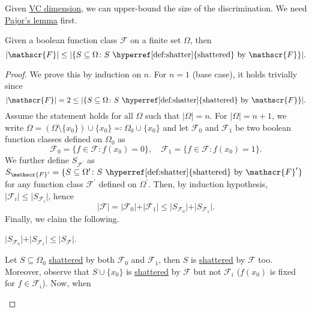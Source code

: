 Given \hyperref[def:VC-dimension]{VC dimension}, we can upper-bound the size of the discrimination. We need \hyperref[lma:Pajor]{Pajor's lemma} first.

\begin{lemma}\label{lma:Pajor}
	Given a boolean function class \(\mathscr{F} \) on a finite set \(\Omega \), then
	\[
		\vert \mathscr{F} \vert \leq \vert \{ S \subseteq \Omega \colon S \text{ \hyperref[def:shatter]{shattered} by } \mathscr{F} \} \vert.
	\]
\end{lemma}
\begin{proof}
	We prove this by induction on \(n\). For \(n = 1\) (base case), it holds trivially since
	\[
		\vert \mathscr{F} \vert = 2 \leq \vert \{ S \subseteq \Omega \colon S \text{ \hyperref[def:shatter]{shattered} by } \mathscr{F} \} \vert.
	\]
	Assume the statement holds for all \(\Omega \) such that \(\vert \Omega \vert = n\). For \(\vert \Omega \vert = n+1\), we write \(\Omega = (\Omega \setminus \{ x_0 \} ) \cup \{ x_0 \} \eqqcolon \Omega _0 \cup \{ x_0 \}\) and let \(\mathscr{F} _0\) and \(\mathscr{F} _1\) be two boolean function classes defined on \(\Omega _0\) as
	\[
		\mathscr{F} _0 = \{ f\in \mathscr{F} \colon f(x_0) = 0\} ,\quad
		\mathscr{F} _1 = \{ f\in \mathscr{F} \colon f(x_0) = 1\} .
	\]
	We further define \(S_{\mathscr{F} ^{\prime} }\) as \(S_{\mathscr{F} ^{\prime} } = \{ S \subseteq \Omega ^{\prime} \colon S \text{ \hyperref[def:shatter]{shattered} by } \mathscr{F} ^{\prime} \}\) for any function class \(\mathscr{F} ^{\prime} \) defined on \(\Omega ^{\prime} \). Then, by induction hypothesis, \(\vert \mathscr{F} _i \vert \leq \vert S_{\mathscr{F} _i} \vert \), hence
	\[
		\vert \mathscr{F} \vert = \vert \mathscr{F} _0 \vert + \vert \mathscr{F} _1 \vert \leq \vert S_{\mathscr{F} _0} \vert + \vert S_{\mathscr{F} _1} \vert.
	\]
	Finally, we claim the following.
	\begin{claim}
		\(\vert S_{\mathscr{F} _0} \vert + \vert S_{\mathscr{F} _1} \vert \leq \vert S _{\mathscr{F} } \vert\).
	\end{claim}
	\begin{explanation}
		Let \(S \subseteq \Omega _0\) \hyperref[def:shatter]{shattered} by both \(\mathscr{F} _0\) and \(\mathscr{F} _1\), then \(S\) is \hyperref[def:shatter]{shattered} by \(\mathscr{F} \) too. Moreover, observe that \(S \cup \{ x_0 \} \) is \hyperref[def:shatter]{shattered} by \(\mathscr{F} \) but not \(\mathscr{F} _i\) (\(f(x_0)\) is fixed for \(f\in \mathscr{F} _i\)). Now, when
		\begin{itemize}

\end{itemize}
\end{explanation}
\end{proof}
